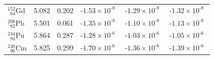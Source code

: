 \begin{table}[b]
\begin{tabular}{lccccc}
$^{152}_{\phantom{0}64}$Gd           & 5.082 & 0.202 & ${\text{-}}{1.53}{\scriptstyle\times}{10^{\text{-}8\phantom{0}}}$ &${\text{-}}{1.29}{\scriptstyle\times}{10^{\text{-}8\phantom{0}}}$&${\text{-}}{1.32}{\scriptstyle\times}{10^{\text{-}8\phantom{0}}}$\\[4pt]
$^{208}_{\phantom{0}82}$Pb           & 5.501 & 0.061 & ${\text{-}}{1.35}{\scriptstyle\times}{10^{\text{-}8\phantom{0}}}$ &${\text{-}}{1.10}{\scriptstyle\times}{10^{\text{-}8\phantom{0}}}$&${\text{-}}{1.13}{\scriptstyle\times}{10^{\text{-}8\phantom{0}}}$\\[4pt]
$^{244}_{\phantom{0}94}$Pu           & 5.864 & 0.287 & ${\text{-}}{1.28}{\scriptstyle\times}{10^{\text{-}6\phantom{0}}}$ &${\text{-}}{1.03}{\scriptstyle\times}{10^{\text{-}6\phantom{0}}}$&${\text{-}}{1.05}{\scriptstyle\times}{10^{\text{-}6\phantom{0}}}$\\[4pt]
$^{248}_{\phantom{0}96}$Cm           & 5.825 & 0.299 & ${\text{-}}{1.70}{\scriptstyle\times}{10^{\text{-}6\phantom{0}}}$ &${\text{-}}{1.36}{\scriptstyle\times}{10^{\text{-}6\phantom{0}}}$&${\text{-}}{1.39}{\scriptstyle\times}{10^{\text{-}6\phantom{0}}}$\\[4pt]
\end{tabular}
\end{table}

